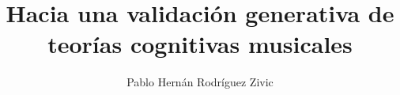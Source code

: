 \documentclass[a4paper,11pt]{article}
\theoremstyle{definition} \newtheorem{axiom}{Axioma}
\begin{document}
\newcommand{\Nat}{\mathbb{N}}
\newcommand{\IM}[1]{\underline{#1}}
\newcommand{\cita}{\textcolor{red}{cita}}
\newcommand{\alert}[1]{\footnote{\textcolor{red}{#1}}}
\newcommand{\red}[1]{\textcolor{red}{#1}}

\newcommand{\comment}[1]{\textcolor{blue}{#1}\newline}
\theoremstyle{definition} \newtheorem{definition}{Definici'on}


\newcommand{\defaultAlignment}{center}
\newcommand{\defaultWidth}{15cm}
\newenvironment{imagen}{
\let\File\empty
\let\Desc\empty
\let\LabelName\empty
\let\Width\defaultWidth
\let\Alignment\defaultAlignment
}{
    \begin{figure}[h]
    \begin{\Alignment}
    \texttt{[image: \\File]}
    \caption{\Desc}
    \label{\LabelName}
    \end{\Alignment}
    \end{figure}

}

\newcommand{\file}[1]{\def\File{#1}}
\newcommand{\desc}[1]{\def\Desc{#1}}
\newcommand{\labelname}[1]{\def\LabelName{#1}}
\newcommand{\width}[1]{\def\Width{#1}}
\newcommand{\alignment}[1]{\def\Alignment{#1}}

\title{Hacia una validaci\'on generativa de teor\'ias cognitivas musicales}
\author{Pablo Hern\'an Rodr\'iguez Zivic}
\maketitle

\tableofcontents
















\appendix




\end{document}
